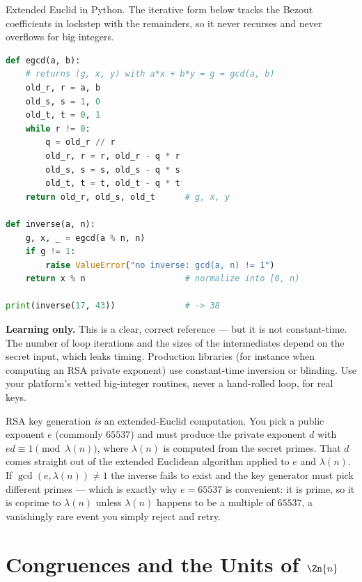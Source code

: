\begin{implementbox}
Extended Euclid in Python. The iterative form below tracks the Bezout coefficients in lockstep with
the remainders, so it never recurses and never overflows for big integers.

\begin{lstlisting}[language=Python]
def egcd(a, b):
    # returns (g, x, y) with a*x + b*y = g = gcd(a, b)
    old_r, r = a, b
    old_s, s = 1, 0
    old_t, t = 0, 1
    while r != 0:
        q = old_r // r
        old_r, r = r, old_r - q * r
        old_s, s = s, old_s - q * s
        old_t, t = t, old_t - q * t
    return old_r, old_s, old_t      # g, x, y

def inverse(a, n):
    g, x, _ = egcd(a % n, n)
    if g != 1:
        raise ValueError("no inverse: gcd(a, n) != 1")
    return x % n                    # normalize into [0, n)

print(inverse(17, 43))              # -> 38
\end{lstlisting}

\textbf{Learning only.} This is a clear, correct reference --- but it is not constant-time. The
number of loop iterations and the sizes of the intermediates depend on the secret input, which
leaks timing. Production libraries (for instance when computing an RSA private exponent) use
constant-time inversion or blinding. Use your platform's vetted big-integer routines, never a
hand-rolled loop, for real keys.
\end{implementbox}

\begin{applicationbox}
RSA key generation \emph{is} an extended-Euclid computation. You pick a public exponent $e$
(commonly $65537$) and must produce the private exponent $d$ with $ed \equiv 1 \pmod{\lambda(n)}$,
where $\lambda(n)$ is computed from the secret primes. That $d$ comes straight out of the extended
Euclidean algorithm applied to $e$ and $\lambda(n)$. If $\gcd(e, \lambda(n)) \neq 1$ the inverse
fails to exist and the key generator must pick different primes --- which is exactly why $e = 65537$
is convenient: it is prime, so it is coprime to $\lambda(n)$ unless $\lambda(n)$ happens to be a
multiple of $65537$, a vanishingly rare event you simply reject and retry.
\end{applicationbox}

\section{Congruences and the Units of $\Zn{n}$}
\label{ch04:congruences}

